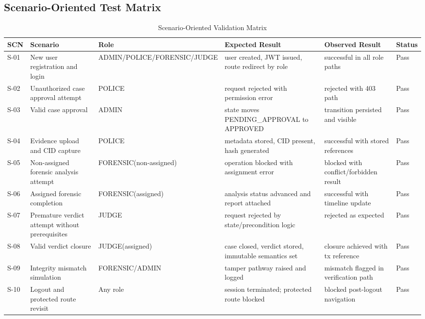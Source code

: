 \documentclass[conference]{IEEEtran}
\begin{document}
\subsection{Scenario-Oriented Test Matrix}
\begin{table}[!t]
\caption{Scenario-Oriented Validation Matrix}
\centering
\begin{tabular}{p{0.9cm} p{2.9cm} p{2.2cm} p{3.7cm} p{2.2cm} p{2.0cm}}
\hline
\textbf{SCN} & \textbf{Scenario} & \textbf{Role} & \textbf{Expected Result} & \textbf{Observed Result} & \textbf{Status} \\
\hline
S-01 & New user registration and login & ADMIN/POLICE/FORENSIC/JUDGE & user created, JWT issued, route redirect by role & successful in all role paths & Pass \\
S-02 & Unauthorized case approval attempt & POLICE & request rejected with permission error & rejected with 403 path & Pass \\
S-03 & Valid case approval & ADMIN & state moves PENDING\_APPROVAL to APPROVED & transition persisted and visible & Pass \\
S-04 & Evidence upload and CID capture & POLICE & metadata stored, CID present, hash generated & successful with stored references & Pass \\
S-05 & Non-assigned forensic analysis attempt & FORENSIC(non-assigned) & operation blocked with assignment error & blocked with conflict/forbidden result & Pass \\
S-06 & Assigned forensic completion & FORENSIC(assigned) & analysis status advanced and report attached & successful with timeline update & Pass \\
S-07 & Premature verdict attempt without prerequisites & JUDGE & request rejected by state/precondition logic & rejected as expected & Pass \\
S-08 & Valid verdict closure & JUDGE(assigned) & case closed, verdict stored, immutable semantics set & closure achieved with tx reference & Pass \\
S-09 & Integrity mismatch simulation & FORENSIC/ADMIN & tamper pathway raised and logged & mismatch flagged in verification path & Pass \\
S-10 & Logout and protected route revisit & Any role & session terminated; protected route blocked & blocked post-logout navigation & Pass \\
\hline
\end{tabular}
\end{table}
\end{document}
